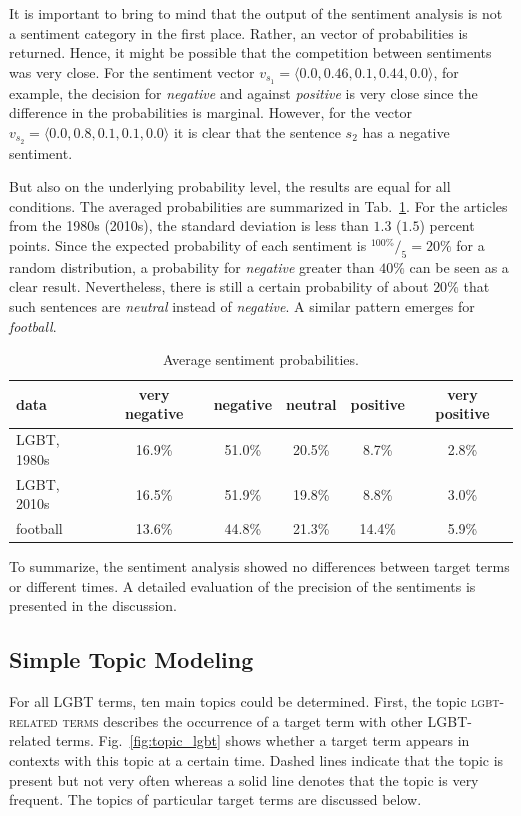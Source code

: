 \documentclass[10pt,a4paper,twocolumn]{scrartcl}
\begin{document}
It is important to bring to mind that the output of the sentiment analysis is not a sentiment category in the first place. Rather, an vector of probabilities is returned.  Hence, it might be possible that the competition between sentiments was very close. For the sentiment vector $v_{s_1} = \langle 0.0, 0.46, 0.1, 0.44, 0.0\rangle$, for example, the decision for \textit{negative} and against \textit{positive} is very close since the difference in the probabilities is marginal. However, for the vector $v_{s_2} = \langle 0.0, 0.8, 0.1, 0.1, 0.0\rangle$ it is clear that the sentence $s_2$ has a negative sentiment.

But also on the underlying probability level, the results are equal for all conditions. The averaged probabilities are summarized in Tab.~\ref{tab:prob}. For the articles from the 1980s (2010s), the standard deviation is less than $1.3$ ($1.5$) percent points. Since the expected probability of each sentiment is $^{100\%}/_{5} = 20\%$  for a random distribution, a probability for \textit{negative} greater than $40\%$ can be seen as a clear result. Nevertheless, there is still a certain probability of about $20\%$ that such sentences are \textit{neutral} instead of \textit{negative}. A similar pattern emerges for \textit{football}.

\begin{table}
\centering
\caption{Average sentiment probabilities.} \label{tab:prob}
\begin{tabular}{lccccc}
\toprule
data & very negative & negative & neutral & positive & very positive\\
\midrule
LGBT, 1980s & 16.9\% & 51.0\% & 20.5\% & 8.7\% & 2.8\%\\
LGBT, 2010s & 16.5\% & 51.9\% & 19.8\% & 8.8\% & 3.0\%\\
football &  13.6\% & 44.8\% & 21.3\% & 14.4\% & 5.9\%\\
\bottomrule
\end{tabular}
\end{table}

To summarize, the sentiment analysis showed no differences between target terms or different times. A detailed evaluation of the precision of the sentiments is presented in the discussion.

\subsection{Simple Topic Modeling}
For all LGBT terms, ten main topics could be determined. First, the topic \textsc{lgbt-related terms} describes the occurrence of a target term with other LGBT-related terms. Fig.~\ref{fig:topic_lgbt} shows whether a target term appears in contexts with this topic at a certain time. Dashed lines indicate that the topic is present but not very often whereas a solid line denotes that the topic is very frequent. The topics of particular target terms are discussed below.
\end{document}
